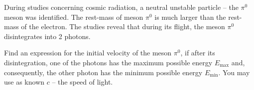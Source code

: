 During studies concerning cosmic radiation, a neutral unstable particle -- the
$\pi^0$ meson was identified. The rest-mass of meson $\pi^0$ is much larger
than the rest-mass of the electron. The studies reveal that during its flight,
the meson $\pi^0$ disintegrates into 2 photons.

Find an expression for the initial velocity of the meson $\pi^0$, if after its
disintegration, one of the photons has the maximum possible energy
$E_{\mathrm{max}}$ and, consequently, the other photon has the minimum
possible energy $E_{\mathrm{min}}$. You may use as known $c$ -- the speed of
light.
